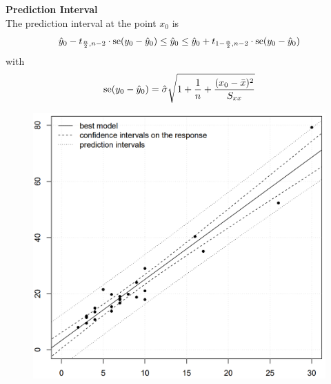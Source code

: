\textbf{Prediction Interval}\\
The prediction interval at the point $x_0$ is
\begin{equation}
  \hat{y}_0 - t_{\frac{\alpha}{2},n-2} \cdot \textup{se}(y_0 - \hat{y}_0)
  \leq \hat{y}_0 \leq
  \hat{y}_0 + t_{1 - \frac{\alpha}{2},n-2} \cdot \textup{se}(y_0 - \hat{y}_0)
\end{equation}
with
\begin{equation}
  \textup{se}(y_0 - \hat{y}_0) = \hat{\sigma}\sqrt{1 + \frac{1}{n} + \frac{(x_0 - \bar{x})^2}{S_{xx}}}
\end{equation}

\begin{figure}[H]
  \centering
  \includegraphics[width=0.8\linewidth]{Pics/7.4.png}
\end{figure}

